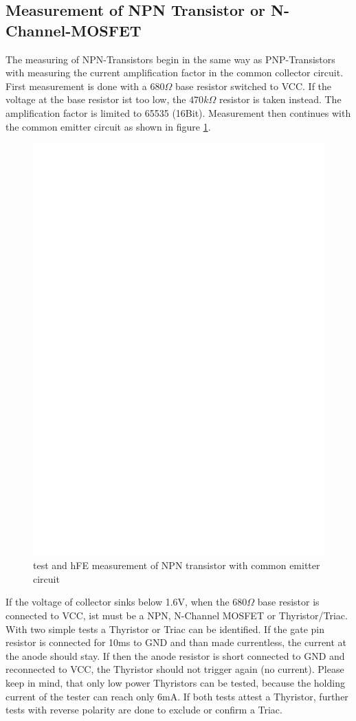 \subsection{Measurement of NPN Transistor or N-Channel-MOSFET}
The measuring of NPN-Transistors begin in the same way as PNP-Transistors with measuring
the current amplification factor in the common collector circuit.
First measurement is done with a \(680\Omega\) base resistor switched to VCC. If the
voltage at the base resistor ist too low, the \(470k\Omega\) resistor is taken instead.
The amplification factor is limited to 65535 (16Bit).
Measurement then continues with the common emitter circuit as shown in figure \ref{fig:npnce}.
\begin{figure}[H]
\centering
\includegraphics[]{../FIG/NPNce.eps}
\caption{test and hFE measurement of NPN transistor with common emitter circuit }
\label{fig:npnce}
\end{figure}
If the voltage of collector sinks below 1.6V, when the \(680\Omega\) base resistor is connected to VCC,
ist must be a NPN, N-Channel MOSFET or Thyristor/Triac.
With two simple tests a Thyristor or Triac can be identified. If the gate pin resistor is connected
for 10ms to GND and than made currentless, the current at the anode should stay.
If then the anode resistor is short connected to GND and reconnected to VCC, the Thyristor should not
trigger again (no current). Please keep in mind, that only low power Thyristors can be tested, because
the holding current of the tester can reach only 6mA. If both tests attest a Thyristor, further tests with
reverse polarity are done to exclude or confirm a Triac.

